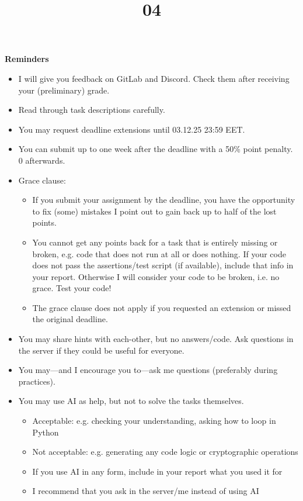 \documentclass{homework}
\title{04}
\date{\DTMdate{2025-12-06}}
\begin{document}
\maketitle

\textbf{Reminders}

\begin{itemize}
  \item I will give you feedback on GitLab and Discord.
  Check them after receiving your (preliminary) grade.
  \item Read through task descriptions carefully.
  \item You may request deadline extensions until 03.12.25 23:59 EET.
  \item You can submit up to one week after the deadline with a 50\% point penalty.
  0 afterwards.
  \item Grace clause:
  \begin{itemize}
    \item If you submit your assignment by the deadline, you have the opportunity to fix (some) mistakes I point out to gain back up to half of the lost points.
    \item You cannot get any points back for a task that is entirely missing or broken, e.g. code that does not run at all or does nothing.
    If your code does not pass the assertions/test script (if available), include that info in your report.
    Otherwise I will consider your code to be broken, i.e. no grace.
    Test your code!
    \item The grace clause does not apply if you requested an extension or missed the original deadline.
  \end{itemize}
  \item You may share hints with each-other, but no answers/code.
  Ask questions in the server if they could be useful for everyone.
  \item You may---and I encourage you to---ask me questions (preferably during practices).
  \item You may use AI as help, but not to solve the tasks themselves.
  \begin{itemize}
    \item Acceptable: e.g. checking your understanding, asking how to loop in Python
    \item Not acceptable: e.g. generating any code logic or cryptographic operations
    \item If you use AI in any form, include in your report what you used it for
    \item I recommend that you ask in the server/me instead of using AI

\end{itemize}
\end{itemize}
\end{document}
